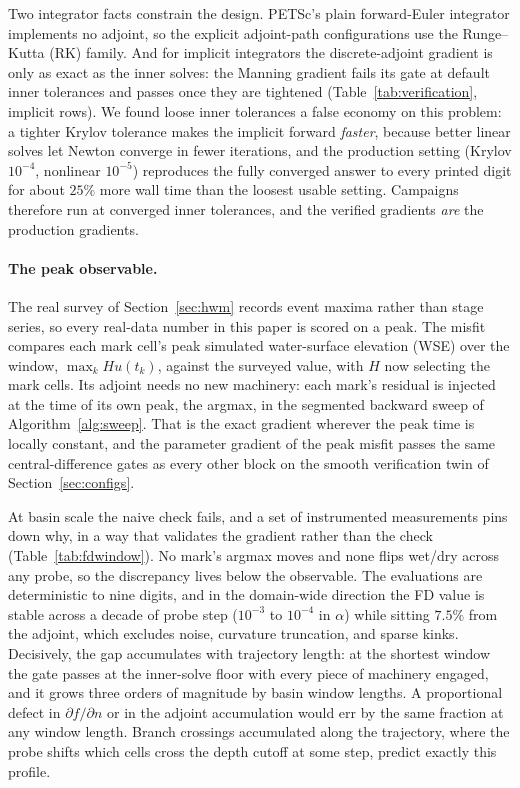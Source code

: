 \documentclass[11pt]{article}
\begin{document}
Two integrator facts constrain the design. PETSc's plain forward-Euler
integrator implements no adjoint, so the explicit adjoint-path
configurations use the Runge--Kutta (RK) family. And for implicit integrators the discrete-adjoint
gradient is only as exact as the inner solves: the Manning gradient
fails its gate at default inner tolerances and passes once they are
tightened (Table~\ref{tab:verification}, implicit rows). We found
loose inner tolerances a false economy on this problem: a tighter
Krylov tolerance makes the implicit forward \emph{faster}, because
better linear solves let Newton converge in fewer iterations, and the
production setting (Krylov $10^{-4}$, nonlinear $10^{-5}$) reproduces
the fully converged answer to every printed digit for about $25\%$
more wall time than the loosest usable setting. Campaigns therefore
run at converged inner tolerances, and the verified gradients
\emph{are} the production gradients.

\paragraph{The peak observable.}
The real survey of Section~\ref{sec:hwm} records event maxima rather
than stage series, so every real-data number in this paper is scored
on a peak. The misfit compares each mark cell's peak simulated
water-surface elevation (WSE) over the window, $\max_k H u(t_k)$,
against the surveyed value, with $H$ now selecting the mark cells.
Its adjoint needs no new machinery: each mark's residual is injected
at the time of its own peak, the argmax, in the segmented backward
sweep of Algorithm~\ref{alg:sweep}. That is the exact gradient
wherever the peak time is locally constant, and the parameter
gradient of the peak misfit passes the same central-difference gates
as every other block on the smooth verification twin of
Section~\ref{sec:configs}.

At basin scale the naive check fails, and a set of instrumented
measurements pins down why, in a way that validates the gradient
rather than the check (Table~\ref{tab:fdwindow}). No mark's argmax
moves and none flips wet/dry across any probe, so the discrepancy
lives below the observable. The evaluations are deterministic to nine
digits, and in the domain-wide direction the FD value is stable across
a decade of probe step ($10^{-3}$ to $10^{-4}$ in $\alpha$) while
sitting $7.5\%$ from the adjoint, which excludes noise, curvature
truncation, and sparse kinks.
Decisively, the gap accumulates with trajectory length: at the
shortest window the gate passes at the inner-solve floor with every
piece of machinery engaged, and it grows three orders of magnitude by
basin window lengths. A proportional defect in
$\partial f/\partial n$ or in the adjoint accumulation would err by
the same fraction at any window length. Branch crossings accumulated
along the trajectory,
where the probe shifts which cells cross the depth cutoff at some
step, predict exactly this profile.
\end{document}
